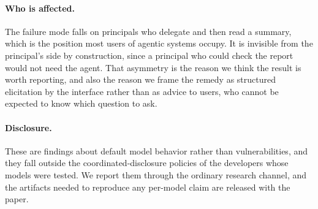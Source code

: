 \paragraph{Who is affected.} The failure mode falls on principals who delegate and then read a summary, which is the position most users of agentic systems occupy. It is invisible from the principal's side by construction, since a principal who could check the report would not need the agent. That asymmetry is the reason we think the result is worth reporting, and also the reason we frame the remedy as structured elicitation by the interface rather than as advice to users, who cannot be expected to know which question to ask.

\paragraph{Disclosure.} These are findings about default model behavior rather than vulnerabilities, and they fall outside the coordinated-disclosure policies of the developers whose models were tested. We report them through the ordinary research channel, and the artifacts needed to reproduce any per-model claim are released with the paper.
